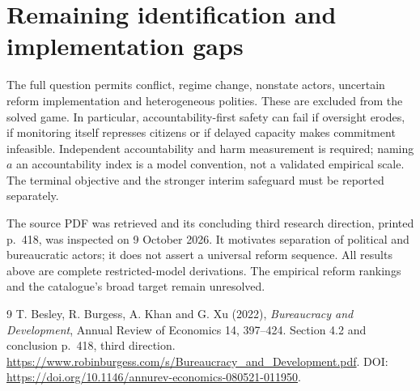 \documentclass[11pt]{article}
\begin{document}
\section{Remaining identification and implementation gaps}
The full question permits conflict, regime change, nonstate actors,
uncertain reform implementation and heterogeneous polities. These are
excluded from the solved game. In particular, accountability-first safety
can fail if oversight erodes, if monitoring itself represses citizens or
if delayed capacity makes commitment infeasible. Independent accountability
and harm measurement is required; naming $a$ an accountability index is a
model convention, not a validated empirical scale. The terminal objective
and the stronger interim safeguard must be reported separately.

The source PDF was retrieved and its concluding third research direction,
printed p.~418, was inspected on 9 October 2026. It motivates separation
of political and bureaucratic actors; it does not assert a universal reform
sequence. All results above are complete restricted-model derivations.
The empirical reform rankings and the catalogue's broad target remain
unresolved.
\begin{thebibliography}{9}
 T. Besley, R. Burgess, A. Khan and G. Xu (2022),
\emph{Bureaucracy and Development}, Annual Review of Economics 14,
397--424. Section 4.2 and conclusion p.~418, third direction.
\url{https://www.robinburgess.com/s/Bureaucracy_and_Development.pdf}.
DOI: \url{https://doi.org/10.1146/annurev-economics-080521-011950}.
\end{thebibliography}
\end{document}
